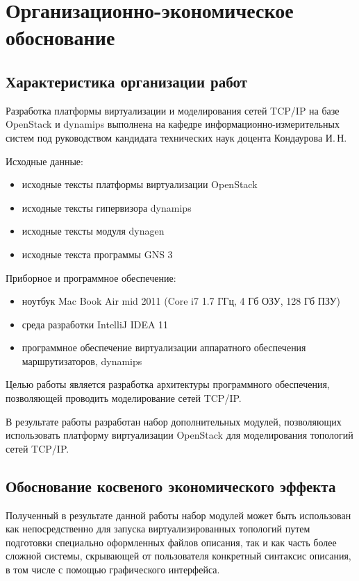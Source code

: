 \chapter{Организационно-экономическое обоснование}

\section{Характеристика организации работ}

Разработка платформы виртуализации и моделирования сетей TCP/IP на базе OpenStack и dynamips выполнена на кафедре информационно-измерительных систем под руководством кандидата технических наук доцента Кондаурова И.\,Н. 

Исходные данные: 
\begin{itemize}
   \item исходные тексты платформы виртуализации OpenStack
   \item исходные тексты гипервизора dynamips
   \item исходные тексты модуля dynagen
   \item исходные текста программы GNS 3
\end{itemize}

Приборное и программное обеспечение:
\begin{itemize}
    \item ноутбук Mac Book Air mid 2011 (Core i7 1.7 ГГц, 4 Гб ОЗУ, 128 Гб ПЗУ)
    \item среда разработки IntelliJ IDEA 11
    \item программное обеспечение виртуализации аппаратного обеспечения маршрутизаторов, dynamips
\end{itemize}

Целью работы является разработка архитектуры программного обеспечения, позволяющей проводить моделирование сетей TCP/IP.

В результате работы разработан набор дополнительных модулей, позволяющих 
использовать платформу виртуализации OpenStack для моделирования топологий сетей TCP/IP.

\section{Обоснование косвеного экономического эффекта}

Полученный в результате данной работы набор модулей может быть использован как 
непосредственно для запуска виртуализированных топологий путем подготовки специально
оформленных файлов описания, так и как часть более сложной системы, скрывающей от
пользователя конкретный синтаксис описания, в том числе с помощью графического 
интерфейса.

